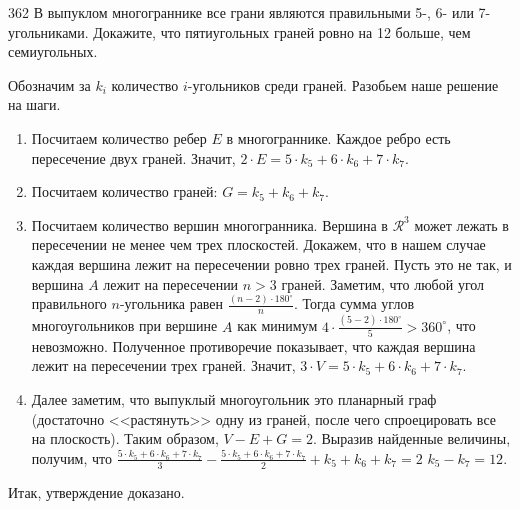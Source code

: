 \begin{task}{362}
    В выпуклом многограннике все грани являются правильными 5-, 6- или 7-угольниками. Докажите, что пятиугольных граней ровно на 12 больше, чем семиугольных.
\end{task}

\begin{solution}
    Обозначим за $k_{i}$ количество $i$-угольников среди граней. Разобьем наше решение на шаги.
    \begin{enumerate}
        \item Посчитаем количество ребер $E$ в многограннике. Каждое ребро есть пересечение двух граней. Значит, $2 \cdot E = 5 \cdot k_{5} + 6 \cdot k_{6} + 7 \cdot k_{7}$.
        \item Посчитаем количество граней: $G = k_{5} + k_{6} + k_{7}$.
        \item Посчитаем количество вершин многогранника. Вершина в $\mathcal{R}^3$ может лежать в пересечении не менее чем трех плоскостей. Докажем, что в нашем случае каждая вершина лежит на пересечении ровно трех граней. Пусть это не так, и вершина $A$ лежит на пересечении $n>3$ граней. Заметим, что любой угол правильного $n$-угольника равен $\frac{(n - 2) \cdot 180^{\circ}}{n}$. Тогда сумма углов многоугольников при вершине $A$ как минимум $4 \cdot \frac{(5 - 2) \cdot 180^{\circ}}{5} > 360^{\circ}$, что невозможно. Полученное противоречие показывает, что каждая вершина лежит на пересечении трех граней. Значит, $3 \cdot V = 5 \cdot k_{5} + 6 \cdot k_{6} + 7 \cdot k_{7}$.
        \item Далее заметим, что выпуклый многоугольник это планарный граф (достаточно <<растянуть>> одну из граней, после чего спроецировать все на плоскость). Таким образом, $V - E + G = 2$. Выразив найденные величины, получим, что $\frac{5 \cdot k_{5} + 6 \cdot k_{6} + 7 \cdot k_{7}}{3} - \frac{5 \cdot k_{5} + 6 \cdot k_{6} + 7 \cdot k_{7}}{2} + k_{5} + k_{6} + k_{7} = 2$ \Rightarrow $k_{5} - k_{7} = 12$.
    \end{enumerate}
    Итак, утверждение доказано.
\end{solution}
    